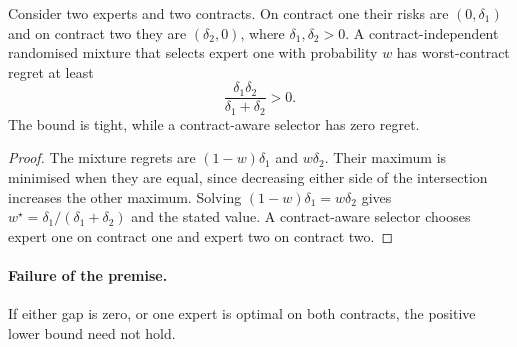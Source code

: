 \begin{theorem}
Consider two experts and two contracts. On contract one their risks are
$(0,\delta_1)$ and on contract two they are $(\delta_2,0)$, where
$\delta_1,\delta_2>0$. A contract-independent randomised mixture that selects
expert one with probability $w$ has worst-contract regret at least
\[
  \frac{\delta_1\delta_2}{\delta_1+\delta_2}>0.
\]
The bound is tight, while a contract-aware selector has zero regret.
\end{theorem}

\begin{proof}
The mixture regrets are $(1-w)\delta_1$ and $w\delta_2$. Their maximum is
minimised when they are equal, since decreasing either side of the intersection
increases the other maximum. Solving
$(1-w)\delta_1=w\delta_2$ gives
$w^\star=\delta_1/(\delta_1+\delta_2)$ and the stated value. A
contract-aware selector chooses expert one on contract one and expert two on
contract two.
\end{proof}

\paragraph{Failure of the premise.}
If either gap is zero, or one expert is optimal on both contracts, the positive
lower bound need not hold.
